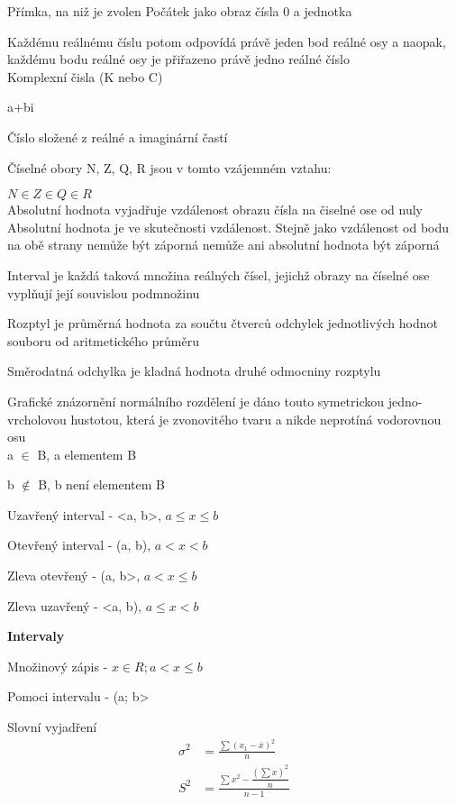 \documentclass[a4paper,12pt]{article}
\begin{document}
Přímka, na niž je zvolen Počátek jako obraz čísla 0 a jednotka

Každému reálnému číslu potom odpovídá právě jeden bod 
reálné osy a naopak, každému bodu reálné osy je přiřazeno právě jedno reálné číslo \\

Komplexní čisla (K nebo C)

a+bi

Číslo složené z reálné a imaginární častí

Číselné obory N, Z, Q, R jsou v tomto vzájemném vztahu:

$N \in Z \in Q \in R$ \\

Absolutní hodnota vyjadřuje vzdálenost obrazu čísla na čiselné ose od nuly
Absolutní hodnota je ve skutečnosti vzdálenost. 
Stejně jako vzdálenost od bodu na obě strany nemůže 
být záporná nemůže ani absolutní hodnota být záporná

Interval je každá taková množina reálných čísel, 
jejichž obrazy na číselné ose vyplňují její souvislou podmnožinu

Rozptyl je průměrná hodnota za součtu 
čtverců odchylek jednotlivých hodnot souboru od aritmetického průměru

Směrodatná odchylka je kladná hodnota druhé odmocniny rozptylu

Grafické znázornění normálního rozdělení je dáno touto symetrickou 
jedno-vrcholovou hustotou, která je zvonovitého tvaru a nikde neprotíná vodorovnou osu
 \\

a $\in$ B, a elementem B

b $\notin $ B, b není elementem B

Uzavřený interval - <a, b>, $a \leq x \leq b$

Otevřený interval - (a, b), $a < x < b$

Zleva otevřený - (a, b>, $a < x \leq b$

Zleva uzavřený - <a, b), $a \leq x < b$

\newpage
\textbf{Intervaly}

Množinový zápis - ${x \in R; a < x \leq b}$

Pomoci intervalu - (a; b>

Slovní vyjadření \\

\begin{align*}
\sigma^2 &= \frac{\sum (x_{1} - \overline{x})^2}{n} \\ 
S^2 &= \frac{\sum x^2 - \dfrac{(\sum x)^2}{n}}{n - 1} \\
\end{align*}
\end{document}
